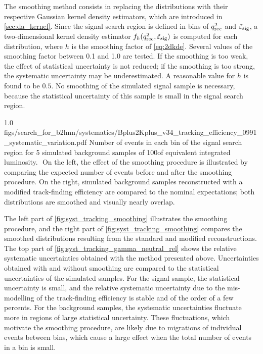 The smoothing method consists in replacing the distributions with their respective Gaussian kernel density estimators, which are introduced in \cref{sec:da_kernel}.
Since the signal search region is defined in bins of $q_{\mathrm{rec}}^2$ and $\tilde{\varepsilon}_{\mathrm{sig}}$, a two-dimensional kernel density estimator $f_h(q_{\mathrm{rec}}^2,\tilde{\varepsilon}_{\mathrm{sig}})$ is computed for each distribution, where $h$ is the smoothing factor of \cref{eq:2dkde}.
Several values of the smoothing factor between 0.1 and 1.0 are tested.
If the smoothing is too weak, the effect of statistical uncertainty is not reduced; if the smoothing is too strong, the systematic uncertainty may be underestimated.
A reasonable value for $h$ is found to be $0.5$.
No smoothing of the simulated signal sample is necessary, because the statistical uncertainty of this sample is small in the signal search region.

{1.0}
{figs/search_for_b2hnn/systematics/Bplus2Kplus_v34_tracking_efficiency_0991_systematic_variation.pdf}
{
Number of events in each bin of the \BKpnn signal search region for 5 simulated background samples of 100\invfb of equivalent integrated luminosity.
\ssrtext$ $
On the left, the effect of the smoothing procedure is illustrated by comparing the expected number of events before and after the smoothing procedure.
On the right, simulated background samples reconstructed with a modified track-finding efficiency are compared to the nominal expectations; both distributions are smoothed and visually nearly overlap.
}


The left part of \cref{fig:syst_tracking_smoothing} illustrates the smoothing procedure, and the right part of \cref{fig:syst_tracking_smoothing} compares the smoothed distributions resulting from the standard and modified reconstructions.
The top part of \cref{fig:syst_tracking_gamma_neutral_rel} shows the relative systematic uncertainties obtained with the method presented above.
Uncertainties obtained with and without smoothing are compared to the statistical uncertainties of the simulated samples.
For the signal sample, the statistical uncertainty is small, and the relative systematic uncertainty due to the mis-modelling of the track-finding efficiency is stable and of the order of a few percents.
For the background samples, the systematic uncertainties fluctuate more in regions of large statistical uncertainty.
These fluctuations, which motivate the smoothing procedure, are likely due to migrations of individual events between bins, which cause a large effect when the total number of events in a bin is small.


